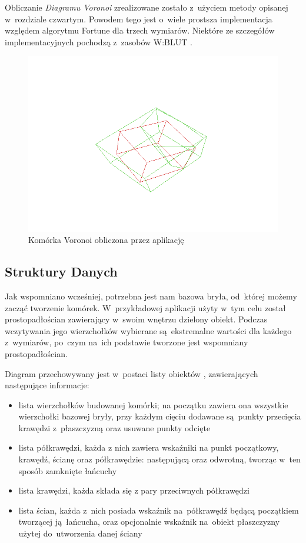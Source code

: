 \documentclass[skorowidz,autorrok,backref,xodstep,oswiadczenie]{wmimgr}
\begin{document}
Obliczanie \emph{Diagramu Voronoi} zrealizowane zostało z~użyciem metody opisanej w~rozdziale czwartym. Powodem tego jest o~wiele prostsza implementacja względem algorytmu Fortune dla trzech wymiarów. Niektóre ze szczegółów implementacyjnych pochodzą z~zasobów W:BLUT \cite{fvan}.

\begin{figure}[ht!]
\centering
\includegraphics[width=140mm]{images/app2_1.png}
\caption{Komórka Voronoi obliczona przez aplikację}
\label{appcell}
\end{figure}

\subsection{Struktury Danych}

Jak wspomniano wcześniej, potrzebna jest nam bazowa bryła, od~której możemy zacząć tworzenie komórek. W~przykładowej aplikacji użyty w~tym celu został prostopadłościan zawierający w~swoim wnętrzu dzielony obiekt. Podczas wczytywania jego wierzchołków wybierane są~ekstremalne wartości dla każdego z~wymiarów, po~czym na~ich podstawie tworzone jest wspomniany prostopadłościan.

Diagram przechowywany jest w~postaci listy obiektów , zawierających następujące informacje:
\begin{itemize}
\item
lista wierzchołków budowanej komórki; na początku zawiera ona wszystkie wierzchołki bazowej bryły, przy każdym cięciu dodawane są~punkty przecięcia krawędzi z~płaszczyzną oraz usuwane punkty odcięte
\item
lista półkrawędzi, każda z nich zawiera wskaźniki na punkt początkowy, krawędź, ścianę oraz półkrawędzie: następującą oraz odwrotną, tworząc w~ten sposób zamknięte łańcuchy
\item
lista krawędzi, każda składa się z pary przeciwnych półkrawędzi
\item
lista ścian, każda z~nich posiada wskaźnik na~półkrawędź będącą początkiem tworzącej ją~łańcucha, oraz opcjonalnie wskaźnik na~obiekt płaszczyzny użytej do~utworzenia danej ściany
\end{itemize}
\end{document}
